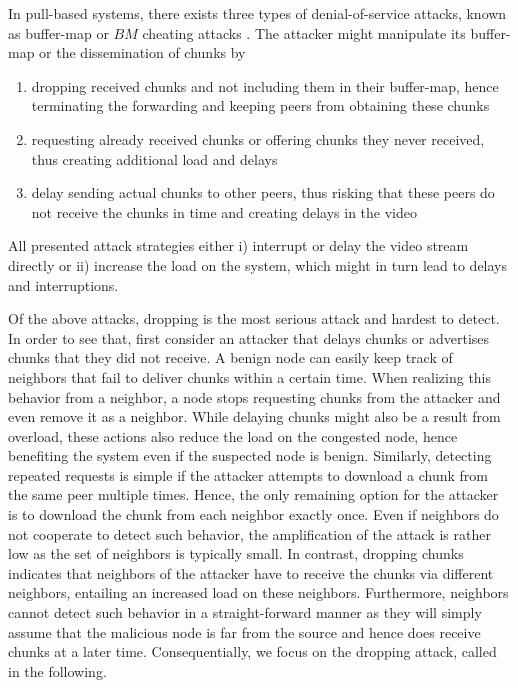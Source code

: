 In pull-based systems, there exists three types of denial-of-service attacks, known as buffer-map or $BM$ cheating attacks \cite{cheatingAnalysis}.  The attacker might manipulate its buffer-map or the dissemination of chunks by 
\begin{enumerate}
\item dropping received chunks and not including them in their buffer-map, hence terminating the forwarding and keeping peers from obtaining these chunks  
\item requesting already received chunks or offering chunks they never received, thus creating additional load and delays
\item delay sending actual chunks to other peers, thus risking that these peers do not receive the chunks in time and creating delays in the video 
\end{enumerate}
All presented attack strategies either i) interrupt or delay the video stream directly or ii) increase the load on the system, which might in turn lead to delays and interruptions. 


Of the above attacks, dropping is the most serious attack and hardest to detect.
In order to see that, first consider an attacker that delays chunks or advertises chunks that they did not receive. A benign node can easily keep track of neighbors that fail to deliver chunks within a certain time. When realizing this behavior from a neighbor, a node stops requesting chunks from the attacker and even remove it as a neighbor. While delaying chunks might also be a result from overload, these actions also reduce the load on the congested node, hence benefiting the system even if the suspected node is benign. 
Similarly, detecting repeated requests is simple if the attacker attempts to download a chunk from the same peer multiple times. Hence, the only remaining option for the attacker is to download the chunk from each neighbor exactly once. Even if neighbors do not cooperate to detect such behavior, the amplification of the attack is rather low as the set of neighbors is typically small. 
In contrast, dropping chunks indicates that neighbors of the attacker have to receive the chunks via different neighbors, entailing an increased  load on these neighbors. Furthermore, neighbors cannot detect such behavior in a straight-forward manner as they will simply assume that the malicious node is far from the source and hence does receive chunks at a later time. 
Consequentially, we focus on the dropping attack, called \drop in the following. 

